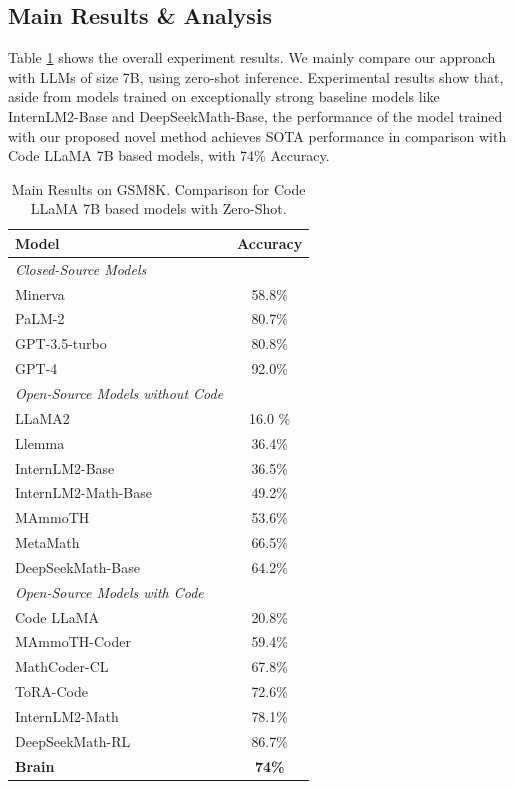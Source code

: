 \documentclass[11pt]{article}
\begin{document}
\subsection{Main Results \& Analysis}


Table \ref{tab:result} shows the overall experiment results. We mainly compare our approach with LLMs of size 7B, using zero-shot inference. Experimental results show that, aside from models trained on exceptionally strong baseline models like InternLM2-Base and DeepSeekMath-Base, the performance of the model trained with our proposed novel method achieves SOTA performance in comparison with Code LLaMA 7B based models, with 74\% Accuracy.

\begin{table}[ht]
\centering
\begin{tabular}{lc}
\toprule
\textbf{Model} & \textbf{Accuracy}  \\
\midrule
{\small\textit{Closed-Source Models}} & \\
Minerva & 58.8\% \\
PaLM-2 & 80.7\% \\
GPT-3.5-turbo & 80.8\% \\
GPT-4 & 92.0\%  \\
\midrule
{\small\textit{Open-Source Models without Code}} & \\
LLaMA2 & 16.0 \% \\
Llemma & 36.4\% \\
InternLM2-Base & 36.5\% \\
InternLM2-Math-Base & 49.2\% \\
MAmmoTH & 53.6\% \\
MetaMath & 66.5\% \\
DeepSeekMath-Base & 64.2\% \\
\midrule
{\small\textit{Open-Source Models with Code}} & \\
Code LLaMA & 20.8\% \\
MAmmoTH-Coder & 59.4\% \\
MathCoder-CL & 67.8\%  \\
ToRA-Code & 72.6\% \\
InternLM2-Math & 78.1\% \\
DeepSeekMath-RL & 86.7\% \\
\textbf{Brain} & \textbf{74\%} \\
\bottomrule
\end{tabular}
\caption{Main Results on GSM8K. Comparison for Code LLaMA 7B based models with Zero-Shot.}
\label{tab:result}
\end{table}
\end{document}
